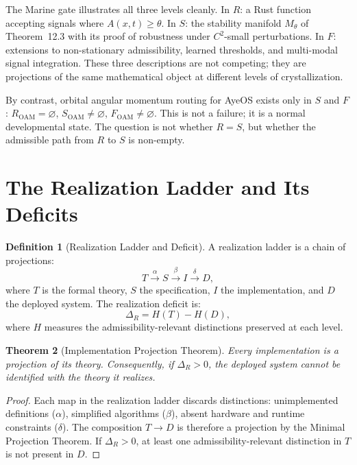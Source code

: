 \documentclass[12pt, oneside]{book}
\theoremstyle{flyxion}
\newtheorem{theorem}{Theorem}[chapter]
\theoremstyle{definition}
\newtheorem{definition}[theorem]{Definition}
\begin{document}
The Marine gate illustrates all three levels cleanly.
In $R$: a Rust function accepting signals where
$A(x,t) \geq \theta$. In $S$: the stability manifold
$M_\theta$ of Theorem~12.3 with its proof of robustness
under $C^2$-small perturbations. In $F$: extensions
to non-stationary admissibility, learned thresholds,
and multi-modal signal integration. These three
descriptions are not competing; they are projections
of the same mathematical object at different levels of
crystallization.

By contrast, orbital angular momentum routing for
AyeOS exists only in $S$ and $F$: $R_\mathrm{OAM}
= \varnothing$, $S_\mathrm{OAM} \neq \varnothing$,
$F_\mathrm{OAM} \neq \varnothing$. This is not a
failure; it is a normal developmental state. The
question is not whether $R = S$, but whether the
admissible path from $R$ to $S$ is non-empty.

\section{The Realization Ladder and Its Deficits}

\begin{definition}[Realization Ladder and Deficit]
A realization ladder is a chain of projections:
\[
T \xrightarrow{\alpha} S \xrightarrow{\beta} I
  \xrightarrow{\delta} D,
\]
where $T$ is the formal theory, $S$ the specification,
$I$ the implementation, and $D$ the deployed system.
The realization deficit is:
\[
\Delta_R = H(T) - H(D),
\]
where $H$ measures the admissibility-relevant
distinctions preserved at each level.
\end{definition}

\begin{theorem}[Implementation Projection Theorem]
\label{thm:impl_projection}
Every implementation is a projection of its theory.
Consequently, if $\Delta_R > 0$, the deployed system
cannot be identified with the theory it realizes.
\end{theorem}

\begin{proof}
Each map in the realization ladder discards
distinctions: unimplemented definitions ($\alpha$),
simplified algorithms ($\beta$), absent hardware
and runtime constraints ($\delta$). The composition
$T \to D$ is therefore a projection by the Minimal
Projection Theorem. If $\Delta_R > 0$, at least one
admissibility-relevant distinction in $T$ is not
present in $D$.
\end{proof}
\end{document}
